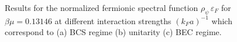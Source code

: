 \begin{figure}[b]
	\centering
	\caption[Fermion spectral function $\rho_{\psi}$ at different interaction strengths]{Results for the normalized fermionic spectral function $\rho_{\psi}\,\varepsilon_F$ for $\beta\mu=0.13146$ at different interaction strengths $(k_Fa)^{-1}$ which correspond to (a) BCS regime (b) unitarity (c) BEC regime.}
	\label{fig:fermion-specs}
\end{figure}
%

